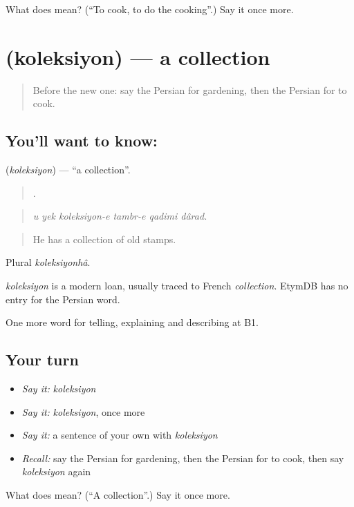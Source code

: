 \begin{tcolorbox}[breakable,colback=teal!4,colframe=teal!35!black,title={Before you move on}]
What does   mean? (\textquotedblleft{}To cook, to do the cooking\textquotedblright{}.) Say it once more.
\end{tcolorbox}
\section[\texorpdfstring{\fa{کلکسیون} (koleksiyon)}{کلکسیون (koleksiyon)}]{ (koleksiyon) — a collection}

\label{lesson:FA-C507-koleksiyon}



\begin{quote}
Before the new one: say the Persian for gardening, then the Persian for to cook.
\end{quote}

\subsection*{You'll want to know: }
\textbf{} (\emph{koleksiyon}) — \textquotedblleft{}a collection\textquotedblright{}.

\begin{quote}
     .
\end{quote}

\begin{quote}
\emph{u yek koleksiyon-e tambr-e qadimi dârad.}
\end{quote}

\begin{quote}
He has a collection of old stamps.
\end{quote}

Plural \emph{koleksiyonhâ}.

\begin{cousinweb}
\emph{koleksiyon} is a modern loan, usually traced to French \emph{collection}. EtymDB has no entry for the Persian word.
\end{cousinweb}

\begin{grammarlens}[title={What you've built}]
One more word for telling, explaining and describing at B1.
\end{grammarlens}

\subsection*{Your turn}
\begin{itemize}
\raggedright
  \item \emph{Say it:} \emph{koleksiyon}
  \item \emph{Say it:} \emph{koleksiyon}, once more
  \item \emph{Say it:} a sentence of your own with \emph{koleksiyon}
  \item \emph{Recall:} say the Persian for gardening, then the Persian for to cook, then say \emph{koleksiyon} again
\end{itemize}

\begin{tcolorbox}[breakable,colback=teal!4,colframe=teal!35!black,title={Before you move on}]
What does  mean? (\textquotedblleft{}A collection\textquotedblright{}.) Say it once more.
\end{tcolorbox}
